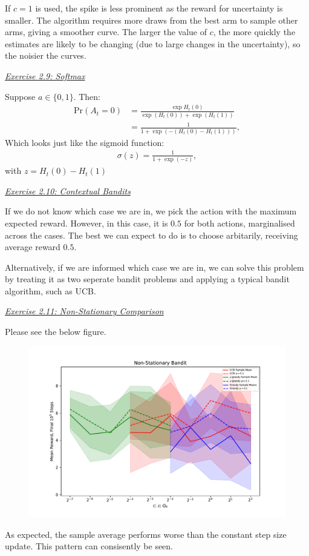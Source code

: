 \documentclass{article}
\newcommand{\myq}[1]{%
	\vspace{1em}
	\noindent\underline{\emph{Exercise #1}}\vspace{0.25em}\linebreak
}
\begin{document}
If $c=1$ is used, the spike is less prominent as the reward for uncertainty is smaller. The algorithm requires more draws from the best arm to sample other arms, giving a smoother curve. The larger the value of $c$, the more quickly the estimates are likely to be changing (due to large changes in the uncertainty), so the noisier the curves. 

\myq{2.9: Softmax}
Suppose $a \in \lbrace 0, 1\rbrace$. Then:
\begin{align}
\text{Pr}(A_t = 0) &= \frac{\exp H_t(0)}{\exp(H_t(0)) + \exp(H_t(1))} \nonumber \\
&= \frac{1}{1 + \exp(-(H_t(0) - H_t(1)))},
\end{align}
Which looks just like the sigmoid function:
\begin{align}
\sigma(z) = \frac{1}{1 + \exp(-z)},
\end{align}
with $z =H_t(0) - H_t(1)$ 

\myq{2.10: Contextual Bandits}
If we do not know which case we are in, we pick the action with the maximum expected reward. However, in this case, it is $0.5$ for both actions, marginalised across the cases. The best we can expect to do is to choose arbitarily, receiving average reward $0.5$. 

Alternatively, if we are informed which case we are in, we can solve this problem by treating it as two seperate bandit problems and applying a typical bandit algorithm, such as UCB. 

\myq{2.11: Non-Stationary Comparison}
Please see the below figure.

\begin{figure}[H]
	\includegraphics[width=\textwidth]{comparison.pdf}
	\centering
\end{figure}
As expected, the sample average performs worse than the constant step size update. This pattern can consisently be seen. 
\end{document}
